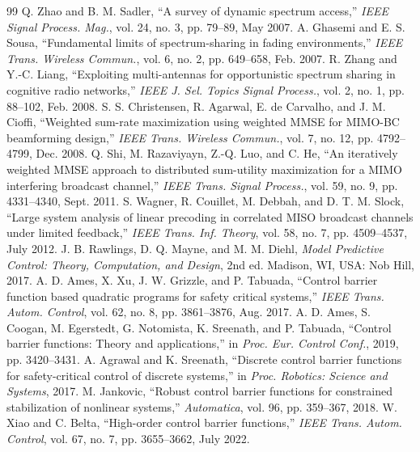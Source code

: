 \begin{thebibliography}{99}
 Q. Zhao and B. M. Sadler, ``A survey of dynamic spectrum access,'' \emph{IEEE Signal Process. Mag.}, vol. 24, no. 3, pp. 79--89, May 2007.
 A. Ghasemi and E. S. Sousa, ``Fundamental limits of spectrum-sharing in fading environments,'' \emph{IEEE Trans. Wireless Commun.}, vol. 6, no. 2, pp. 649--658, Feb. 2007.
 R. Zhang and Y.-C. Liang, ``Exploiting multi-antennas for opportunistic spectrum sharing in cognitive radio networks,'' \emph{IEEE J. Sel. Topics Signal Process.}, vol. 2, no. 1, pp. 88--102, Feb. 2008.
 S. S. Christensen, R. Agarwal, E. de Carvalho, and J. M. Cioffi, ``Weighted sum-rate maximization using weighted MMSE for MIMO-BC beamforming design,'' \emph{IEEE Trans. Wireless Commun.}, vol. 7, no. 12, pp. 4792--4799, Dec. 2008.
 Q. Shi, M. Razaviyayn, Z.-Q. Luo, and C. He, ``An iteratively weighted MMSE approach to distributed sum-utility maximization for a MIMO interfering broadcast channel,'' \emph{IEEE Trans. Signal Process.}, vol. 59, no. 9, pp. 4331--4340, Sept. 2011.
 S. Wagner, R. Couillet, M. Debbah, and D. T. M. Slock, ``Large system analysis of linear precoding in correlated MISO broadcast channels under limited feedback,'' \emph{IEEE Trans. Inf. Theory}, vol. 58, no. 7, pp. 4509--4537, July 2012.
 J. B. Rawlings, D. Q. Mayne, and M. M. Diehl, \emph{Model Predictive Control: Theory, Computation, and Design}, 2nd ed. Madison, WI, USA: Nob Hill, 2017.
 A. D. Ames, X. Xu, J. W. Grizzle, and P. Tabuada, ``Control barrier function based quadratic programs for safety critical systems,'' \emph{IEEE Trans. Autom. Control}, vol. 62, no. 8, pp. 3861--3876, Aug. 2017.
 A. D. Ames, S. Coogan, M. Egerstedt, G. Notomista, K. Sreenath, and P. Tabuada, ``Control barrier functions: Theory and applications,'' in \emph{Proc. Eur. Control Conf.}, 2019, pp. 3420--3431.
 A. Agrawal and K. Sreenath, ``Discrete control barrier functions for safety-critical control of discrete systems,'' in \emph{Proc. Robotics: Science and Systems}, 2017.
 M. Jankovic, ``Robust control barrier functions for constrained stabilization of nonlinear systems,'' \emph{Automatica}, vol. 96, pp. 359--367, 2018.
 W. Xiao and C. Belta, ``High-order control barrier functions,'' \emph{IEEE Trans. Autom. Control}, vol. 67, no. 7, pp. 3655--3662, July 2022.

\end{thebibliography}
